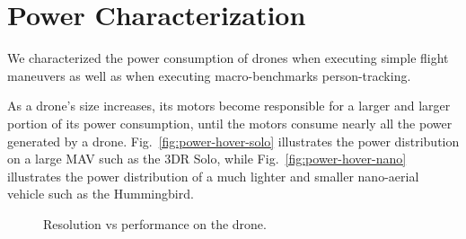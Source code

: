 \section{Power Characterization}

We characterized the power consumption of drones when executing simple flight maneuvers as well as when executing macro-benchmarks person-tracking.

As a drone's size increases, its motors become responsible for a larger and larger portion of its power consumption, until the motors consume nearly all the power generated by a drone. Fig.~\ref{fig:power-hover-solo} illustrates the power distribution on a large MAV such as the 3DR Solo, while Fig.~\ref{fig:power-hover-nano} illustrates the power distribution of a much lighter and smaller nano-aerial vehicle such as the Hummingbird.

\begin{figure}[h]
\centering



\caption{Resolution vs performance on the drone.}
\label{fig:power-distribution}
\end{figure}

